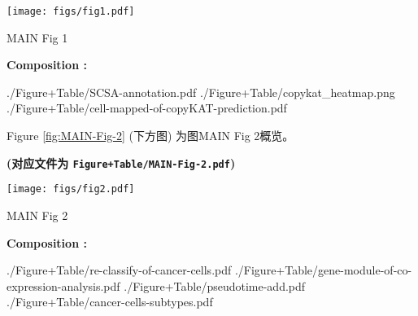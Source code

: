 \documentclass[
]{article}
\begin{document}
\def\@captype{figure}
\begin{center}
\texttt{[image: figs/fig1.pdf]}
\caption{MAIN Fig 1}\label{fig:MAIN-Fig-1}
\end{center}
\begin{center}\begin{tcolorbox}[colback=gray!10, colframe=gray!50, width=0.9\linewidth, arc=1mm, boxrule=0.5pt]
\textbf{
Composition
:}

\vspace{0.5em}

    ./Figure+Table/SCSA-annotation.pdf \newline
./Figure+Table/copykat\_heatmap.png \newline
./Figure+Table/cell-mapped-of-copyKAT-prediction.pdf

\vspace{2em}
\end{tcolorbox}
\end{center}

\begin{center}\vspace{1.5cm}\end{center}

\begin{center}\vspace{1.5cm}\end{center}

Figure \ref{fig:MAIN-Fig-2} (下方图) 为图MAIN Fig 2概览。

\textbf{(对应文件为 \texttt{Figure+Table/MAIN-Fig-2.pdf})}

\def\@captype{figure}
\begin{center}
\texttt{[image: figs/fig2.pdf]}
\caption{MAIN Fig 2}\label{fig:MAIN-Fig-2}
\end{center}
\begin{center}\begin{tcolorbox}[colback=gray!10, colframe=gray!50, width=0.9\linewidth, arc=1mm, boxrule=0.5pt]
\textbf{
Composition
:}

\vspace{0.5em}

    ./Figure+Table/re-classify-of-cancer-cells.pdf \newline
./Figure+Table/gene-module-of-co-expression-analysis.pdf
\newline ./Figure+Table/pseudotime-add.pdf \newline
./Figure+Table/cancer-cells-subtypes.pdf

\vspace{2em}
\end{tcolorbox}
\end{center}
\end{document}
